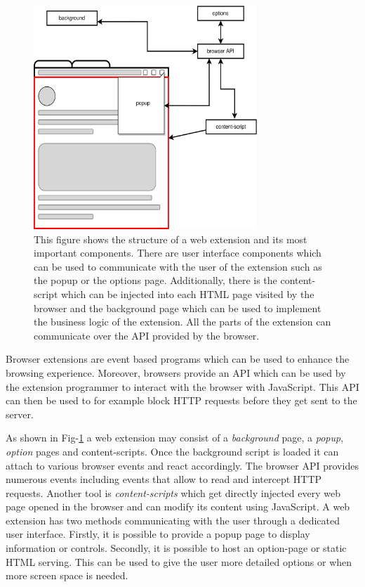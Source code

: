 \begin{figure}[ht!]
  \begin{center}
    \includegraphics[width=0.75\textwidth]{images/ExtensionOverview.png}
  \end{center}
  \caption{This figure shows the structure of a web extension and its most important components. There are user interface components which 
  can be used to communicate with the user of the extension such as the popup or the options page. Additionally, there is the content-script
which can be injected into each HTML page visited by the browser and the background page which can be used to implement the business logic of the extension. All the parts of the 
extension can communicate over the API provided by the browser.}
  \label{fig:extOver}
\end{figure}

Browser extensions are event based programs which can be used to enhance the browsing
experience. Moreover, browsers provide an API which can be used by the extension programmer to interact with the browser with JavaScript.
This API can then be used to for example block HTTP requests before they get sent to the server.

As shown in Fig-\ref{fig:extOver} a web extension may consist of a \emph{background} page, a \emph{popup}, \emph{option} pages and
content-scripts. Once the background script is loaded it can attach to various browser events and react accordingly. The browser API
provides numerous events \cite{browserApi} including events that allow to read and intercept HTTP requests. Another tool is  
\emph{content-scripts} which get directly injected every web page opened in the browser and can modify its content using
JavaScript. A web extension has two methods communicating with the user through a dedicated user interface. Firstly, it is possible
to provide a popup page to display information or controls. Secondly, it is possible to host an option-page or static HTML serving. This can
be used to give the user more detailed options or when more screen space is needed.

